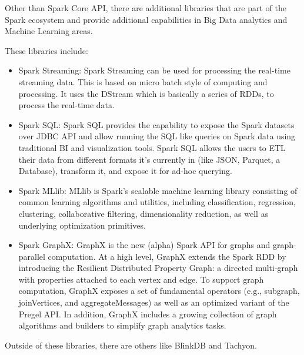 \documentclass[a4paper,12pt]{article}
\begin{document}

Other than Spark Core API, there are additional libraries that are part of the Spark ecosystem and provide additional capabilities in Big Data analytics and Machine Learning areas.

These libraries include:

\begin{itemize}
\item Spark Streaming:
Spark Streaming can be used for processing the real-time streaming data. This is based on micro batch style of computing and processing. It uses the DStream which is basically a series of RDDs, to process the real-time data.
\item Spark SQL:
Spark SQL provides the capability to expose the Spark datasets over JDBC API and allow running the SQL like queries on Spark data using traditional BI and visualization tools. Spark SQL allows the users to ETL their data from different formats it’s currently in (like JSON, Parquet, a Database), transform it, and expose it for ad-hoc querying.
\item Spark MLlib:
MLlib is Spark’s scalable machine learning library consisting of common learning algorithms and utilities, including classification, regression, clustering, collaborative filtering, dimensionality reduction, as well as underlying optimization primitives.
\item Spark GraphX:
GraphX is the new (alpha) Spark API for graphs and graph-parallel computation. At a high level, GraphX extends the Spark RDD by introducing the Resilient Distributed Property Graph: a directed multi-graph with properties attached to each vertex and edge. To support graph computation, GraphX exposes a set of fundamental operators (e.g., subgraph, joinVertices, and aggregateMessages) as well as an optimized variant of the Pregel API. In addition, GraphX includes a growing collection of graph algorithms and builders to simplify graph analytics tasks.
\end{itemize}
Outside of these libraries, there are others like BlinkDB and Tachyon.
\end{document}
